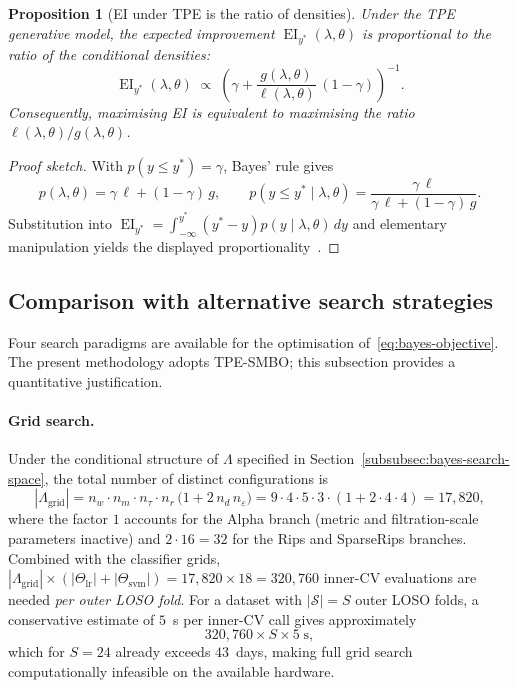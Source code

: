 \documentclass[onluarkali,ingilizce,yukseklisans,karton,LisansustuEgitim]{itutez}
\newtheorem{proposition}{Proposition}[chapter]
\DeclareMathOperator{\EI}{EI}
\providecommand{\1}{\mathbf{1}}
\providecommand{\Sset}{\mathcal{S}}
\begin{document}
\begin{proposition}[EI under TPE is the ratio of densities]
\label{prop:tpe-ratio}
Under the TPE generative model, the expected improvement $\EI_{y^*}(\lambda,\theta)$ is proportional to the ratio of the conditional densities:
\[
  \EI_{y^*}(\lambda,\theta)\;\propto\;\left(\gamma+\frac{g(\lambda,\theta)}{\ell(\lambda,\theta)}\,(1-\gamma)\right)^{-1}.
\]
Consequently, maximising EI is equivalent to maximising the ratio $\ell(\lambda,\theta)/g(\lambda,\theta)$.
\end{proposition}

\begin{proof}[Proof sketch]
With $p(y\leq y^*)=\gamma$, Bayes' rule gives
\[
  p(\lambda,\theta)=\gamma\,\ell+(1-\gamma)\,g,
  \qquad
  p(y\leq y^*\mid\lambda,\theta)=\frac{\gamma\,\ell}{\gamma\,\ell+(1-\gamma)\,g}.
\]
Substitution into $\EI_{y^*}=\int_{-\infty}^{y^*}(y^*-y)p(y\mid\lambda,\theta)\,dy$ and elementary manipulation yields the displayed proportionality~\parencite{bergstra2011algorithms}.
\end{proof}

\subsection{Comparison with alternative search strategies}
\label{subsubsec:alternatives}

Four search paradigms are available for the optimisation of~\eqref{eq:bayes-objective}. The
present methodology adopts TPE-SMBO; this subsection provides a quantitative justification.

\paragraph{Grid search.}
Under the conditional structure of $\Lambda$ specified in
Section~\ref{subsubsec:bayes-search-space}, the total number of distinct
configurations is
\begin{equation}
  |\Lambda_{\mathrm{grid}}|
  = n_w\cdot n_m\cdot n_\tau\cdot n_r\,
    \bigl(1 + 2\,n_d\,n_\varepsilon\bigr)
  = 9\cdot 4\cdot 5\cdot 3\cdot(1+2\cdot 4\cdot 4)
  = 17{,}820,
  \label{eq:grid-count}
\end{equation}
where the factor $1$ accounts for the Alpha branch (metric and filtration-scale parameters
inactive) and $2\cdot 16=32$ for the Rips and SparseRips branches. Combined with the
classifier grids, $|\Lambda_{\mathrm{grid}}|\times(|\Theta_{\mathrm{lr}}|+|\Theta_{\mathrm{svm}}|)
= 17{,}820\times 18 = 320{,}760$ inner-CV evaluations are needed \emph{per outer LOSO fold}.
For a dataset with $|\Sset|=S$ outer LOSO folds, a conservative estimate of $5$~s per inner-CV
call gives approximately
\[
  320{,}760\times S\times 5\;\mathrm{s},
\]
which for $S=24$ already exceeds $43$~days, making full grid search computationally infeasible on the available hardware.
\end{document}
